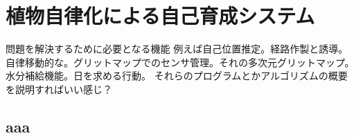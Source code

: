 \chapter{植物自律化による自己育成システム}
問題を解決するために必要となる機能
例えば自己位置推定。経路作製と誘導。自律移動的な。グリットマップでのセンサ管理。それの多次元グリットマップ。
水分補給機能。日を求める行動。
それらのプログラムとかアルゴリズムの概要を説明すればいい感じ？
\section{aaa}
